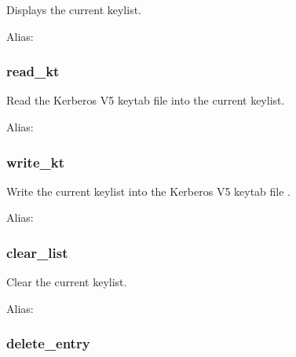 \documentclass[letterpaper,10pt,english]{sphinxmanual}
\begin{document}
Displays the current keylist.

Alias: 


\subsubsection{read\_kt}
\label{\detokenize{admin/admin_commands/ktutil:read-kt}}\begin{quote}

 
\end{quote}

Read the Kerberos V5 keytab file  into the current keylist.

Alias: 


\subsubsection{write\_kt}
\label{\detokenize{admin/admin_commands/ktutil:write-kt}}\begin{quote}

 
\end{quote}

Write the current keylist into the Kerberos V5 keytab file .

Alias: 


\subsubsection{clear\_list}
\label{\detokenize{admin/admin_commands/ktutil:clear-list}}\begin{quote}

\end{quote}

Clear the current keylist.

Alias: 


\subsubsection{delete\_entry}
\label{\detokenize{admin/admin_commands/ktutil:delete-entry}}\begin{quote}

 
\end{quote}
\end{document}
